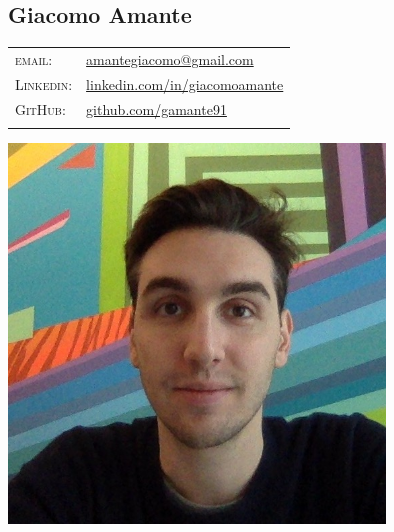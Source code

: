\documentclass[a4paper,10pt]{article}
\begin{document}
   \pagestyle{empty}

   \begin{minipage}{0.75\textwidth}
      \vspace{-10mm}
      \begin{flushleft}
         \section{\Huge Giacomo Amante}
         \vspace{2mm}
         \begin{tabular}{ll}
            \textsc{email:} & \href{mailto:amantegiacomo@gmail.com}{amantegiacomo@gmail.com} \\
            \textsc{Linkedin:} & 
            \href{http://www.linkedin.com/in/giacomoamante}{\color{black}linkedin.com/in/giacomoamante}\\
            \textsc{GitHub:} & \href{https://github.com/gamante91}{github.com/gamante91}\\
            \multicolumn{2}{c}{} \\
         \end{tabular}
      \end{flushleft}
   \end{minipage}
   \begin{minipage}[c]{0.25\textwidth}
      \begin{center}
         \includegraphics[width=0.75\textwidth]{resources/GiacomoAmante_lowres.jpg}
      \end{center}
   \end{minipage}
\end{document}
